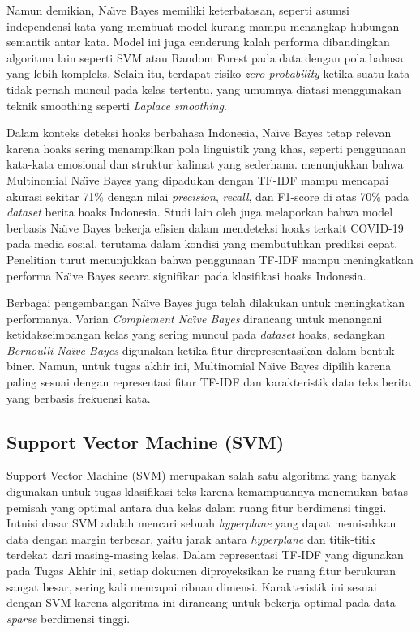 Namun demikian, Na\"{\i}ve Bayes memiliki keterbatasan, seperti asumsi independensi kata yang membuat model kurang mampu menangkap hubungan semantik antar kata. Model ini juga cenderung kalah performa dibandingkan algoritma lain seperti SVM atau Random Forest pada data dengan pola bahasa yang lebih kompleks. Selain itu, terdapat risiko \textit{zero probability} ketika suatu kata tidak pernah muncul pada kelas tertentu, yang umumnya diatasi menggunakan teknik smoothing seperti \textit{Laplace smoothing}.

Dalam konteks deteksi hoaks berbahasa Indonesia, Na\"{\i}ve Bayes tetap relevan karena hoaks sering menampilkan pola linguistik yang khas, seperti penggunaan kata-kata emosional dan struktur kalimat yang sederhana. \textcite{pratiwi2022hoax} menunjukkan bahwa Multinomial Na\"{\i}ve Bayes yang dipadukan dengan TF-IDF mampu mencapai akurasi sekitar 71\% dengan nilai \textit{precision}, \textit{recall}, dan F1-score di atas 70\% pada \textit{dataset} berita hoaks Indonesia. Studi lain oleh \textcite{cahyono2024fast} juga melaporkan bahwa model berbasis Na\"{\i}ve Bayes bekerja efisien dalam mendeteksi hoaks terkait COVID-19 pada media sosial, terutama dalam kondisi yang membutuhkan prediksi cepat. Penelitian \textcite{prasetyo2019evaluation} turut menunjukkan bahwa penggunaan TF-IDF mampu meningkatkan performa Na\"{\i}ve Bayes secara signifikan pada klasifikasi hoaks Indonesia.

Berbagai pengembangan Na\"{\i}ve Bayes juga telah dilakukan untuk meningkatkan performanya. Varian \textit{Complement Na\"{\i}ve Bayes} dirancang untuk menangani ketidakseimbangan kelas yang sering muncul pada \textit{dataset} hoaks, sedangkan \textit{Bernoulli Na\"{\i}ve Bayes} digunakan ketika fitur direpresentasikan dalam bentuk biner. Namun, untuk tugas akhir ini, Multinomial Na\"{\i}ve Bayes dipilih karena paling sesuai dengan representasi fitur TF-IDF dan karakteristik data teks berita yang berbasis frekuensi kata.

\subsection{Support Vector Machine (SVM)}

Support Vector Machine (SVM) merupakan salah satu algoritma yang banyak digunakan untuk tugas klasifikasi teks karena kemampuannya menemukan batas pemisah yang optimal antara dua kelas dalam ruang fitur berdimensi tinggi. Intuisi dasar SVM adalah mencari sebuah \textit{hyperplane} yang dapat memisahkan data dengan margin terbesar, yaitu jarak antara \textit{hyperplane} dan titik-titik terdekat dari masing-masing kelas. Dalam representasi TF-IDF yang digunakan pada Tugas Akhir ini, setiap dokumen diproyeksikan ke ruang fitur berukuran sangat besar, sering kali mencapai ribuan dimensi. Karakteristik ini sesuai dengan SVM karena algoritma ini dirancang untuk bekerja optimal pada data \textit{sparse} berdimensi tinggi.

